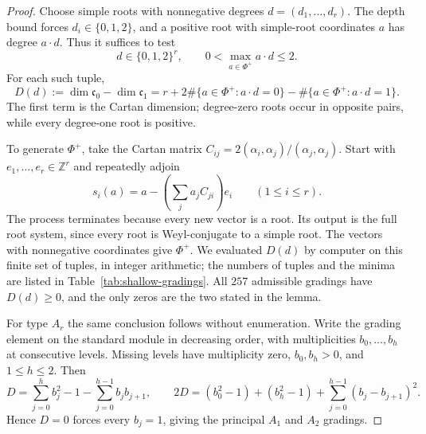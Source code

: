 \documentclass{article}
\theoremstyle{definition}
\theoremstyle{remark}
\begin{document}
\begin{proof}
Choose simple roots with nonnegative degrees
$d=(d_1,\ldots,d_r)$. The depth bound forces
$d_i\in\{0,1,2\}$, and a positive root with simple-root coordinates
$a$ has degree $a\cdot d$. Thus it suffices to test
\begin{equation}
 d\in\{0,1,2\}^r,\qquad
 0<\max_{a\in\Phi^+}a\cdot d\le2.
\end{equation}
For each such tuple,
\begin{equation}
 D(d):=\dim\mathfrak c_0-\dim\mathfrak c_1
 =r+2\#\{a\in\Phi^+:a\cdot d=0\}
     -\#\{a\in\Phi^+:a\cdot d=1\}.
\end{equation}
The first term is the Cartan dimension; degree-zero roots occur in
opposite pairs, while every degree-one root is positive.

To generate $\Phi^+$, take the Cartan matrix
$C_{ij}=2(\alpha_i,\alpha_j)/(\alpha_j,\alpha_j)$.
Start with $e_1,\ldots,e_r\in\mathbb Z^r$ and repeatedly adjoin
\begin{equation}
 s_i(a)=a-\left(\sum_j a_jC_{ji}\right)e_i
 \qquad(1\le i\le r).
\end{equation}
The process terminates because every new vector is a root. Its output
is the full root system, since every root is Weyl-conjugate to a
simple root. The vectors with nonnegative coordinates give $\Phi^+$.
We evaluated $D(d)$ by computer on this finite set of tuples, in integer
arithmetic; the numbers of tuples and the minima are listed in
Table~\ref{tab:shallow-gradings}. All $257$ admissible gradings have
$D(d)\ge0$, and the only zeros are the two stated in the lemma.

For type $A_r$ the same conclusion follows without enumeration.
Write the grading element on the standard module in decreasing order,
with multiplicities $b_0,\ldots,b_h$ at consecutive levels. Missing
levels have multiplicity zero, $b_0,b_h>0$, and $1\le h\le2$.
Then
\begin{equation}
 D=\sum_{j=0}^h b_j^2-1-\sum_{j=0}^{h-1}b_jb_{j+1},
 \qquad
 2D=(b_0^2-1)+(b_h^2-1)
       +\sum_{j=0}^{h-1}(b_j-b_{j+1})^2.
\end{equation}
Hence $D=0$ forces every $b_j=1$, giving the principal $A_1$ and
$A_2$ gradings.
\end{proof}
\end{document}
